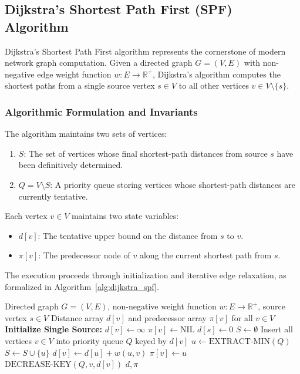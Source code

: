 \subsection{Dijkstra's Shortest Path First (SPF) Algorithm}
Dijkstra's Shortest Path First algorithm \cite{dijkstra1959note} represents the cornerstone of modern network graph computation. Given a directed graph $G = (V, E)$ with non-negative edge weight function $w: E \to \mathbb{R}^+$, Dijkstra's algorithm computes the shortest paths from a single source vertex $s \in V$ to all other vertices $v \in V \setminus \{s\}$.

\subsubsection{Algorithmic Formulation and Invariants}
The algorithm maintains two sets of vertices:
\begin{enumerate}
    \item $S$: The set of vertices whose final shortest-path distances from source $s$ have been definitively determined.
    \item $Q = V \setminus S$: A priority queue storing vertices whose shortest-path distances are currently tentative.
\end{enumerate}

Each vertex $v \in V$ maintains two state variables:
\begin{itemize}
    \item $d[v]$: The tentative upper bound on the distance from $s$ to $v$.
    \item $\pi[v]$: The predecessor node of $v$ along the current shortest path from $s$.
\end{itemize}

The execution proceeds through initialization and iterative edge relaxation, as formalized in Algorithm~\ref{alg:dijkstra_spf}.

\begin{algorithm}[htbp]
\caption{Dijkstra's Shortest Path First (SPF) Algorithm}
\label{alg:dijkstra_spf}
\begin{algorithmic}[1]
\REQUIRE Directed graph $G = (V, E)$, non-negative weight function $w: E \to \mathbb{R}^+$, source vertex $s \in V$
\ENSURE Distance array $d[v]$ and predecessor array $\pi[v]$ for all $v \in V$
\STATE \textbf{Initialize Single Source:}
    \STATE $d[v] \gets \infty$
    \STATE $\pi[v] \gets \text{NIL}$
\ENDFOR
\STATE $d[s] \gets 0$
\STATE $S \gets \emptyset$
\STATE Insert all vertices $v \in V$ into priority queue $Q$ keyed by $d[v]$
    \STATE $u \gets \text{EXTRACT-MIN}(Q)$
    \STATE $S \gets S \cup \{u\}$
            \STATE {}
            \STATE $d[v] \gets d[u] + w(u, v)$
            \STATE $\pi[v] \gets u$
            \STATE $\text{DECREASE-KEY}(Q, v, d[v])$
        \ENDIF
    \ENDFOR
\ENDWHILE
\RETURN $d, \pi$
\end{algorithmic}
\end{algorithm}

